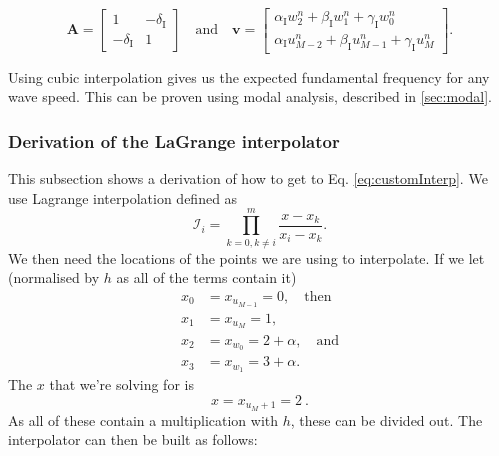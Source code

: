 \documentclass[dvipsnames]{article}
\begin{document}
\begin{equation}\label{eq:Av}
    \mathbf{A}
    =
     \begin{bmatrix}
         1 & -\delta_\text{I} \\
         -\delta_\text{I} & 1
    \end{bmatrix} \quad \text{and} \quad \mathbf{v} = \begin{bmatrix}
    \alpha_\text{I} w_2^n+ \beta_\text{I}w_1^n + \gamma_\text{I}w_0^n \\
    \alpha_\text{I} u_{M-2}^n + \beta_\text{I}u_{M-1}^n + \gamma_\text{I} u_{M}^n
    \end{bmatrix}.
\end{equation}

Using cubic interpolation gives us the expected fundamental frequency for any wave speed. This can be proven using modal analysis, described in \ref{sec:modal}.

\subsubsection{Derivation of the LaGrange interpolator}\label{sec:lagrangeDeriv}
This subsection shows a derivation of how to get to Eq. \eqref{eq:customInterp}. We use Lagrange interpolation defined as
\begin{equation}\label{eq:lagrangeForm}
    \mathcal{I}_i = \prod_{k = 0, k\neq i}^m \frac{x-x_k}{x_i-x_k}.
\end{equation}
We then need the locations of the points we are using to interpolate. If we let (normalised by $h$ as all of the terms contain it)
\begin{equation}
    \begin{aligned}
     x_0 &= x_{u_{M-1}} = 0, \quad \text{then}\\
     x_1 &= x_{u_M} = 1, \\
     x_2& = x_{w_0} = 2 + \alpha , \quad \text{and}\\
     x_3 &= x_{w_1} = 3 + \alpha .
    \end{aligned}
\end{equation}
The $x$ that we're solving for is 
\begin{equation}
    x = x_{u_M+1} = 2\ .
\end{equation}
As all of these contain a multiplication with $h$, these can be divided out. The interpolator can then be built as follows:
\end{document}
